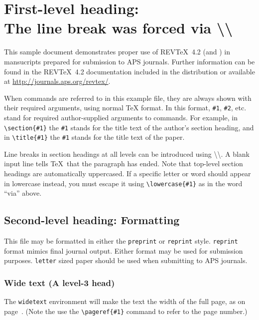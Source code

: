 \documentclass[%
 reprint,
 amsmath,amssymb,
 aps,
]{revtex4-2}
\begin{document}

\section{\label{sec:level1}First-level heading:\protect\\ The line
break was forced \lowercase{via} \textbackslash\textbackslash}

This sample document demonstrates proper use of REV\TeX~4.2 (and
\LaTeXe) in mansucripts prepared for submission to APS
journals. Further information can be found in the REV\TeX~4.2
documentation included in the distribution or available at
\url{http://journals.aps.org/revtex/}.

When commands are referred to in this example file, they are always
shown with their required arguments, using normal \TeX{} format. In
this format, \verb+#1+, \verb+#2+, etc. stand for required
author-supplied arguments to commands. For example, in
\verb+\section{#1}+ the \verb+#1+ stands for the title text of the
author's section heading, and in \verb+\title{#1}+ the \verb+#1+
stands for the title text of the paper.

Line breaks in section headings at all levels can be introduced using
\textbackslash\textbackslash. A blank input line tells \TeX\ that the
paragraph has ended. Note that top-level section headings are
automatically uppercased. If a specific letter or word should appear in
lowercase instead, you must escape it using \verb+\lowercase{#1}+ as
in the word ``via'' above.

\subsection{\label{sec:level2}Second-level heading: Formatting}

This file may be formatted in either the \texttt{preprint} or
\texttt{reprint} style. \texttt{reprint} format mimics final journal output. 
Either format may be used for submission purposes. \texttt{letter} sized paper should
be used when submitting to APS journals.

\subsubsection{Wide text (A level-3 head)}
The \texttt{widetext} environment will make the text the width of the
full page, as on page~\pageref{eq:wideeq}. (Note the use the
\verb+\pageref{#1}+ command to refer to the page number.) 
\end{document}

